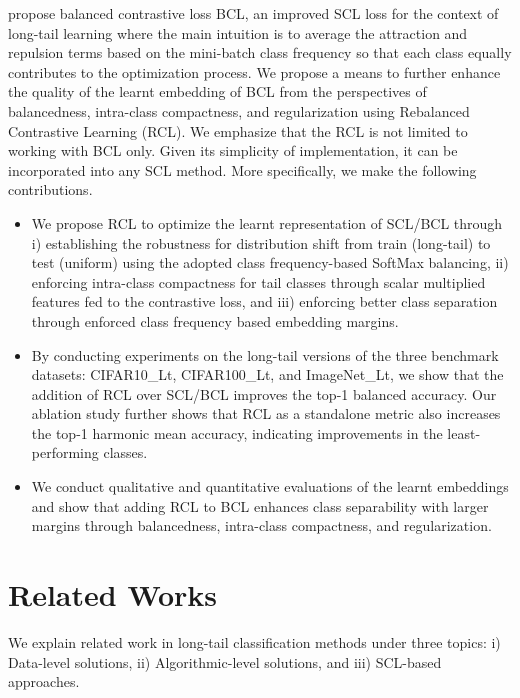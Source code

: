 \cite{bcl} propose balanced contrastive loss BCL, an improved SCL loss for the context of long-tail learning where the main intuition is to average the attraction and repulsion terms based on the mini-batch class frequency so that each class equally contributes to the optimization process. We propose a means to further enhance the quality of the learnt embedding of BCL from the perspectives of balancedness, intra-class compactness, and regularization using Rebalanced Contrastive Learning (RCL). We emphasize that the RCL is not limited to working with BCL only. Given its simplicity of implementation, it can be incorporated into any SCL method. More specifically, we make the following contributions.
\begin{itemize}
\item We propose  RCL  to optimize the learnt representation of  SCL/BCL through i) 
 establishing the robustness for distribution shift from train (long-tail) to test (uniform) using the adopted class frequency-based SoftMax balancing, ii) enforcing intra-class compactness for tail classes through scalar multiplied features fed to the contrastive loss, and iii) enforcing better class separation through enforced class frequency based embedding margins.
\item By conducting experiments on the long-tail versions of the three benchmark datasets: CIFAR10\_Lt, CIFAR100\_Lt, and ImageNet\_Lt, we show that the addition of RCL over SCL/BCL improves the top-1 balanced accuracy. Our ablation study further shows that RCL as a standalone metric also increases the top-1 harmonic mean accuracy, indicating improvements in the least-performing classes.
   
 \item We conduct qualitative and quantitative evaluations of the learnt embeddings and show that adding RCL to BCL enhances class separability with larger margins through balancedness, intra-class compactness, and regularization.
 
\end{itemize}

\section{Related Works}
 We explain related work in long-tail classification methods under three topics: i) Data-level solutions, ii) Algorithmic-level solutions, and iii) SCL-based approaches.  
 
